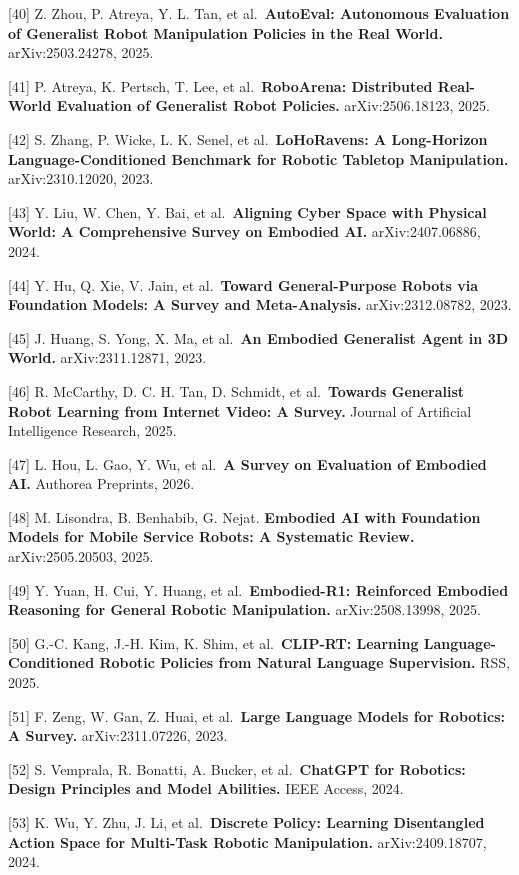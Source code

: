 {[}40{]} Z. Zhou, P. Atreya, Y. L. Tan, et al.~\textbf{AutoEval: Autonomous Evaluation of Generalist Robot Manipulation Policies in the Real World.} arXiv:2503.24278, 2025.

{[}41{]} P. Atreya, K. Pertsch, T. Lee, et al.~\textbf{RoboArena: Distributed Real-World Evaluation of Generalist Robot Policies.} arXiv:2506.18123, 2025.

{[}42{]} S. Zhang, P. Wicke, L. K. Senel, et al.~\textbf{LoHoRavens: A Long-Horizon Language-Conditioned Benchmark for Robotic Tabletop Manipulation.} arXiv:2310.12020, 2023.

{[}43{]} Y. Liu, W. Chen, Y. Bai, et al.~\textbf{Aligning Cyber Space with Physical World: A Comprehensive Survey on Embodied AI.} arXiv:2407.06886, 2024.

{[}44{]} Y. Hu, Q. Xie, V. Jain, et al.~\textbf{Toward General-Purpose Robots via Foundation Models: A Survey and Meta-Analysis.} arXiv:2312.08782, 2023.

{[}45{]} J. Huang, S. Yong, X. Ma, et al.~\textbf{An Embodied Generalist Agent in 3D World.} arXiv:2311.12871, 2023.

{[}46{]} R. McCarthy, D. C. H. Tan, D. Schmidt, et al.~\textbf{Towards Generalist Robot Learning from Internet Video: A Survey.} Journal of Artificial Intelligence Research, 2025.

{[}47{]} L. Hou, L. Gao, Y. Wu, et al.~\textbf{A Survey on Evaluation of Embodied AI.} Authorea Preprints, 2026.

{[}48{]} M. Lisondra, B. Benhabib, G. Nejat. \textbf{Embodied AI with Foundation Models for Mobile Service Robots: A Systematic Review.} arXiv:2505.20503, 2025.

{[}49{]} Y. Yuan, H. Cui, Y. Huang, et al.~\textbf{Embodied-R1: Reinforced Embodied Reasoning for General Robotic Manipulation.} arXiv:2508.13998, 2025.

{[}50{]} G.-C. Kang, J.-H. Kim, K. Shim, et al.~\textbf{CLIP-RT: Learning Language-Conditioned Robotic Policies from Natural Language Supervision.} RSS, 2025.

{[}51{]} F. Zeng, W. Gan, Z. Huai, et al.~\textbf{Large Language Models for Robotics: A Survey.} arXiv:2311.07226, 2023.

{[}52{]} S. Vemprala, R. Bonatti, A. Bucker, et al.~\textbf{ChatGPT for Robotics: Design Principles and Model Abilities.} IEEE Access, 2024.

{[}53{]} K. Wu, Y. Zhu, J. Li, et al.~\textbf{Discrete Policy: Learning Disentangled Action Space for Multi-Task Robotic Manipulation.} arXiv:2409.18707, 2024.

